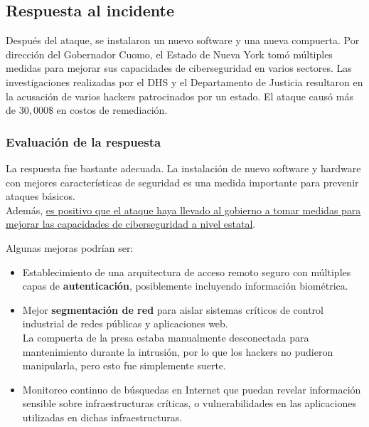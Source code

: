 \subsection{Respuesta al incidente}
Después del ataque, se instalaron un nuevo software y una nueva compuerta. Por dirección del Gobernador Cuomo, el Estado de Nueva York tomó múltiples medidas para mejorar sus capacidades de ciberseguridad en varios sectores. Las investigaciones realizadas por el DHS y el Departamento de Justicia resultaron en la acusación de varios hackers patrocinados por un estado. El ataque causó más de $30,000\$$ en costos de remediación.

\subsubsection{Evaluación de la respuesta}
La respuesta fue bastante adecuada.
La instalación de nuevo software y hardware con mejores características de seguridad es una medida importante para prevenir ataques básicos.\\
Además, \ul{es positivo que el ataque haya llevado al gobierno a tomar medidas para mejorar las capacidades de ciberseguridad a nivel estatal}.



Algunas mejoras podrían ser:
\begin{itemize}
    \item Establecimiento de una arquitectura de acceso remoto seguro con múltiples capas de \textbf{autenticación}, posiblemente incluyendo información biométrica.
    \item Mejor \textbf{segmentación de red} para aislar sistemas críticos de control industrial de redes públicas y aplicaciones web.\\
    La compuerta de la presa estaba manualmente desconectada para mantenimiento durante la intrusión, por lo que los hackers no pudieron manipularla, pero esto fue simplemente suerte.
    \item Monitoreo continuo de búsquedas en Internet que puedan revelar información sensible sobre infraestructuras críticas, o vulnerabilidades en las aplicaciones utilizadas en dichas infraestructuras.
\end{itemize}

